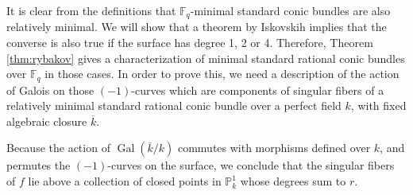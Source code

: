 \documentclass[a4paper, 11pt, reqno]{amsart}
\numberwithin{equation}{section} \numberwithin{figure}{section}
\DeclareMathOperator{\Pic}{Pic}
\DeclareMathOperator{\Gal}{Gal}
\def \F {{\mathbb F}}
\def \P {{\mathbb P}}
\newcommand{\ra}{\rightarrow}
\theoremstyle{definition}
\numberwithin{lemma}{section}
\begin{document}

It is clear from the definitions that $\F_q$-minimal standard conic bundles are also relatively minimal. We will show that a theorem by Iskovskih implies that the converse is also true if the surface has degree 1, 2 or 4. Therefore, Theorem \ref{thm:rybakov} gives a characterization of minimal standard rational conic bundles over $\F_q$ in those cases. In order to prove this, we need a description of the action of Galois on those $(-1)$-curves which are components of singular fibers of a relatively minimal standard rational conic bundle over a perfect field $k$, with fixed algebraic closure $\overline{k}$.

Because the action of $\Gal(\overline{k}/k)$ commutes with morphisms defined over $k$, and permutes the $(-1)$-curves on the surface, we conclude that the singular fibers of $f$ lie above a collection of closed points in $\P^1_k$ whose degrees sum to $r$. 

\end{document}
